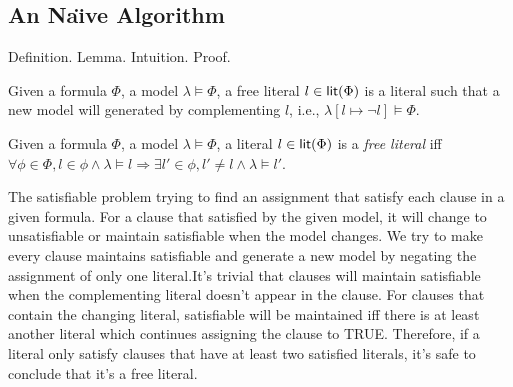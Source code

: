 


\subsection{An Na\"{\i}ve Algorithm}
Definition.  Lemma.  Intuition. Proof.
\begin{definition}
Given a formula $\Phi$, a model $\lambda\models\Phi$, a free literal $l\in\textsf{lit}(\Phi)$ is a literal such that a new model will generated by complementing $l$, i.e., $\lambda[l\mapsto\neg l]\models\Phi$.
\end{definition}

\begin{lemma}
Given a formula $\Phi$, a model $\lambda\models\Phi$, a literal $l\in\textsf{lit}(\Phi)$ is a \emph{free literal} iff $\forall\phi\in\Phi, l\in\phi\wedge\lambda\models l \Longrightarrow \exists l'\in\phi, l'\neq l\wedge\lambda\models l'$.
\end{lemma}

The satisfiable problem trying to find an assignment that satisfy each clause in a given formula. For a clause that satisfied by the given model, it will change to unsatisfiable or maintain satisfiable when the model changes. We try to make every clause maintains satisfiable and generate a new model by negating the assignment of only one literal.It's trivial that clauses will maintain satisfiable when the complementing literal doesn't appear in the clause. For clauses that contain the changing literal, satisfiable will be maintained iff there is at least another literal which continues assigning the clause to TRUE. Therefore, if a literal only satisfy clauses that have at least two satisfied literals, it's safe to conclude that it's a free literal.

